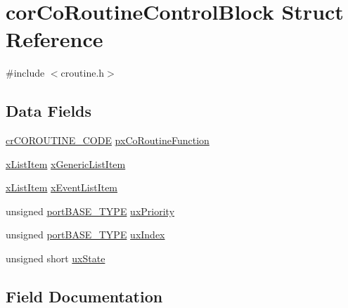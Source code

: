 \hypertarget{structcor_co_routine_control_block}{}\section{cor\+Co\+Routine\+Control\+Block Struct Reference}
\label{structcor_co_routine_control_block}


{\ttfamily \#include $<$croutine.\+h$>$}

\subsection*{Data Fields}
\begin{DoxyCompactItemize}
\item 
\mbox{\hyperlink{croutine_8h_a8e0f640ebfe355ce6ad2555fc94a4a9e}{cr\+C\+O\+R\+O\+U\+T\+I\+N\+E\+\_\+\+C\+O\+DE}} \mbox{\hyperlink{structcor_co_routine_control_block_acc98c7364cd88e8e034a5f9bba113832}{px\+Co\+Routine\+Function}}
\item 
\mbox{\hyperlink{list_8h_abc3e65a10b5c5f39142e64e69311797f}{x\+List\+Item}} \mbox{\hyperlink{structcor_co_routine_control_block_ad088a2410ffd125ce32562e2faa4861d}{x\+Generic\+List\+Item}}
\item 
\mbox{\hyperlink{list_8h_abc3e65a10b5c5f39142e64e69311797f}{x\+List\+Item}} \mbox{\hyperlink{structcor_co_routine_control_block_ae3df50ba6714e9c2683cefa31dc0bc50}{x\+Event\+List\+Item}}
\item 
unsigned \mbox{\hyperlink{portmacro_8h_a1ebe82d24d764ae4e352f7c3a9f92c01}{port\+B\+A\+S\+E\+\_\+\+T\+Y\+PE}} \mbox{\hyperlink{structcor_co_routine_control_block_af736666edff352eba690b3a5878bbdde}{ux\+Priority}}
\item 
unsigned \mbox{\hyperlink{portmacro_8h_a1ebe82d24d764ae4e352f7c3a9f92c01}{port\+B\+A\+S\+E\+\_\+\+T\+Y\+PE}} \mbox{\hyperlink{structcor_co_routine_control_block_a9f4a873d7b5447f3677639080c8f5f51}{ux\+Index}}
\item 
unsigned short \mbox{\hyperlink{structcor_co_routine_control_block_adb706fe642d1c39528402ec6393fcaa9}{ux\+State}}
\end{DoxyCompactItemize}


\subsection{Field Documentation}
\mbox{\label{structcor_co_routine_control_block_acc98c7364cd88e8e034a5f9bba113832}} 
